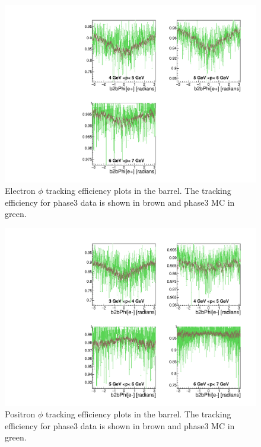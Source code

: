\documentclass[a4paper,11pt,twosided,final,german,openbib,pdftex,listof=totoc,bibliography=totoc]{scrbook}
\begin{document}
\begin{figure}[!htbp]
	\centering
	\includegraphics[width=\textwidth]{Plots/master3/xPMPhiemBarrelP3}
	\caption[Momentum $\phi$ Electron Barrel Efficiency Phase3]{Electron $\phi$ tracking efficiency plots in the barrel. The tracking efficiency for phase3 data is shown in brown and phase3 MC in green.}
	\label{plt:xPMPhiemBarrel3}
\end{figure}


\begin{figure}[!htbp]
	\centering
	\includegraphics[width=\textwidth]{Plots/master3/xPMPhiepBarrelP3}
	\caption[Momentum $\phi$ Positron Barrel Efficiency Phase3]{Positron $\phi$ tracking efficiency plots in the barrel. The tracking efficiency for phase3 data is shown in brown and phase3 MC in green.}
	\label{plt:xPMPhiepBarrel3}
\end{figure}
\end{document}
